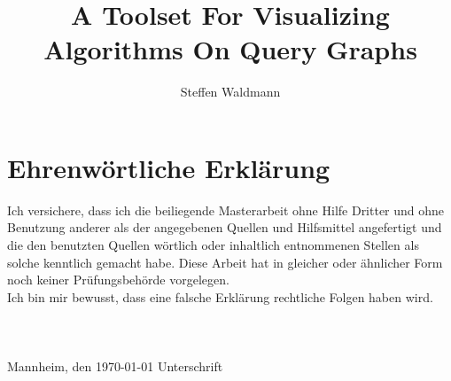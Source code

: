 \documentclass[a4paper,12pt,titlepage,twoside]{article}
\title{A Toolset For Visualizing Algorithms On Query Graphs}
\author{Steffen Waldmann}
\theoremstyle{definition}
\numberwithin{equation}{section}
\newcommand{\clearemptydoublepage}{\newpage{\pagestyle{empty}\cleardoublepage}}
\begin{document}
\maketitle
\clearemptydoublepage

\tableofcontents
\clearpage
\listofalgorithms
\listoffigures
\listoftables











\newpage

\thispagestyle{empty}

\section*{Ehrenwörtliche Erklärung}
Ich versichere, dass ich die beiliegende Masterarbeit ohne Hilfe Dritter
und ohne Benutzung anderer als der angegebenen Quellen und Hilfsmittel 
angefertigt und die den benutzten Quellen wörtlich oder inhaltlich 
entnommenen Stellen als solche kenntlich gemacht habe. Diese Arbeit 
hat in gleicher oder ähnlicher Form noch keiner Prüfungsbehörde 
vorgelegen.\\
Ich bin mir bewusst, dass eine falsche Erklärung rechtliche Folgen haben
wird.\\ \\ \\ \\
\vspace{2cm}
Mannheim, den \today \hspace{4cm} Unterschrift  \\
\end{document}

